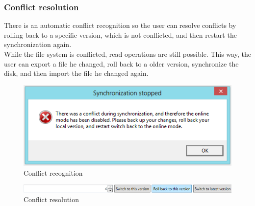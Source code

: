 \documentclass[JCDReport.tex]{subfiles}
\begin{document}
\subsubsection{Conflict resolution}
There is an automatic conflict recognition so the user can resolve conflicts by rolling back to a specific version, which is not conflicted, and then restart the synchronization again.\\
While the file system is conflicted, read operations are still possible. This way, the user can export a file he changed, roll back to a older version, synchronize the disk, and then import the file he changed again.
\begin{figure}[h!]
	\centering
	\includegraphics[scale=1]{imageslukas/synchronization_conflict1.png}
	\caption{Conflict recognition}
\end{figure}
\begin{figure}[h!]
	\centering
	\includegraphics[scale=0.75]{imageslukas/synchronization_conflict2.png}
	\caption{Conflict resolution}
\end{figure}

\end{document}
